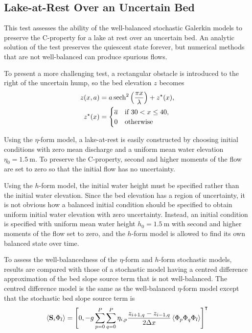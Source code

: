 \subsection{Lake-at-Rest Over an Uncertain Bed}

This test assesses the ability of the well-balanced stochastic Galerkin models to preserve the C-property for a lake at rest over an uncertain bed.
An analytic solution of the test preserves the quiescent state forever, but numerical methods that are not well-balanced can produce spurious flows.

To present a more challenging test, a rectangular obstacle is introduced to the right of the uncertain hump, so the bed elevation $z$ becomes
\begin{subequations}
\begin{align}
    z(x, a) &= a \operatorname{sech}^2 \left( \frac{\pi x}{\lambda} \right) + z^\star(x) \text{,} \\
    z^\star(x) &= \begin{cases}
    \overline{a} & \text{if $30 < x \leq 40$,} \\
    0 & \text{otherwise}
    \end{cases}
\end{align}
\end{subequations}

Using the $\eta$-form model, a lake-at-rest is easily constructed by choosing initial conditions with zero mean discharge and a uniform mean water elevation $\eta_0 = \SI{1.5}{\meter}$.
To preserve the C-property, second and higher moments of the flow are set to zero so that the initial flow has no uncertainty.

Using the $h$-form model, the initial water height must be specified rather than the initial water elevation.
Since the bed elevation has a region of uncertainty, it is not obvious how a balanced initial condition should be specified to obtain uniform initial water elevation with zero uncertainty.
Instead, an initial condition is specified with uniform mean water height $h_0 = \SI{1.5}{\meter}$ with second and higher moments of the flow set to zero, and the $h$-form model is allowed to find its own balanced state over time.

To assess the well-balancedness of the $\eta$-form and $h$-form stochastic models, results are compared with those of a stochastic model having a centred difference approximation of the bed slope source term that is not well-balanced.
The centred difference model is the same as the well-balanced $\eta$-form model except that the stochastic bed slope source term is
\begin{align}
    \left\langle \mathbf{S}_i \Phi_l \right\rangle =
    \left[ 0, -g \sum_{p=0}^P \sum_{q=0}^P \eta_{i,p}
    \frac{z_{i+1,q} - z_{i-1,q}}{2 \Delta x}
    \left\langle \Phi_p \Phi_q \Phi_l \right\rangle \right]^\intercal
\end{align}


